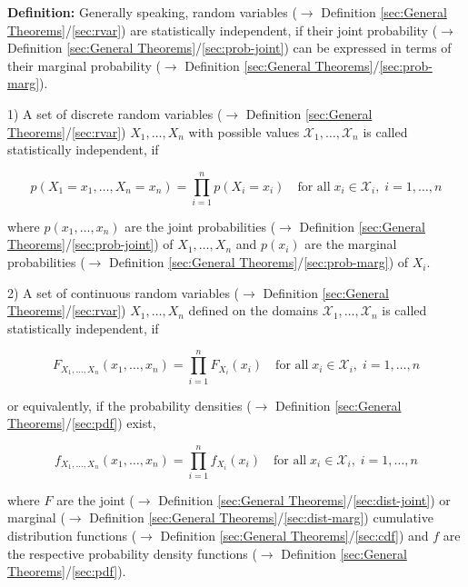 \documentclass[a4paper,12pt,twoside]{book}
\begin{document}
\textbf{Definition:} Generally speaking, random variables ($\rightarrow$ Definition \ref{sec:General Theorems}/\ref{sec:rvar}) are statistically independent, if their joint probability ($\rightarrow$ Definition \ref{sec:General Theorems}/\ref{sec:prob-joint}) can be expressed in terms of their marginal probability ($\rightarrow$ Definition \ref{sec:General Theorems}/\ref{sec:prob-marg}).

\vspace{1em}
1) A set of discrete random variables ($\rightarrow$ Definition \ref{sec:General Theorems}/\ref{sec:rvar}) $X_1, \ldots, X_n$ with possible values $\mathcal{X}_1, \ldots, \mathcal{X}_n$ is called statistically independent, if

\begin{equation} \label{eq:ind-disc-ind}
p(X_1 = x_1, \ldots, X_n = x_n) = \prod_{i=1}^{n} p(X_i = x_i) \quad \text{for all} \; x_i \in \mathcal{X}_i, \; i = 1, \ldots, n
\end{equation}

where $p(x_1, \ldots, x_n)$ are the joint probabilities ($\rightarrow$ Definition \ref{sec:General Theorems}/\ref{sec:prob-joint}) of $X_1, \ldots, X_n$ and $p(x_i)$ are the marginal probabilities ($\rightarrow$ Definition \ref{sec:General Theorems}/\ref{sec:prob-marg}) of $X_i$.

\vspace{1em}
2) A set of continuous random variables ($\rightarrow$ Definition \ref{sec:General Theorems}/\ref{sec:rvar}) $X_1, \ldots, X_n$ defined on the domains $\mathcal{X}_1, \ldots, \mathcal{X}_n$ is called statistically independent, if

\begin{equation} \label{eq:ind-cont-ind-F}
F_{X_1,\ldots,X_n}(x_1,\ldots,x_n) = \prod_{i=1}^{n} F_{X_i}(x_i) \quad \text{for all} \; x_i \in \mathcal{X}_i, \; i = 1, \ldots, n
\end{equation}

or equivalently, if the probability densities ($\rightarrow$ Definition \ref{sec:General Theorems}/\ref{sec:pdf}) exist,

\begin{equation} \label{eq:ind-cont-ind-f}
f_{X_1,\ldots,X_n}(x_1,\ldots,x_n) = \prod_{i=1}^{n} f_{X_i}(x_i) \quad \text{for all} \; x_i \in \mathcal{X}_i, \; i = 1, \ldots, n
\end{equation}

where $F$ are the joint ($\rightarrow$ Definition \ref{sec:General Theorems}/\ref{sec:dist-joint}) or marginal ($\rightarrow$ Definition \ref{sec:General Theorems}/\ref{sec:dist-marg}) cumulative distribution functions ($\rightarrow$ Definition \ref{sec:General Theorems}/\ref{sec:cdf}) and $f$ are the respective probability density functions ($\rightarrow$ Definition \ref{sec:General Theorems}/\ref{sec:pdf}).
\end{document}
